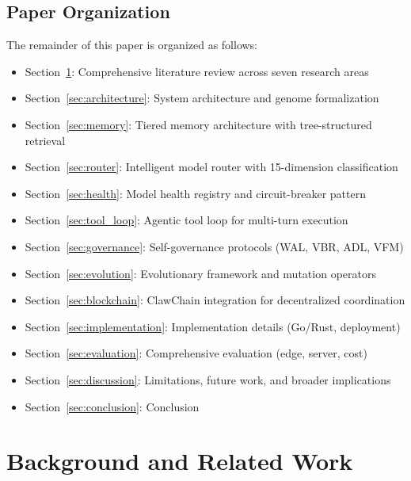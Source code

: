 \documentclass{article}
\begin{document}
\subsection{Paper Organization}

The remainder of this paper is organized as follows:

\begin{itemize}[leftmargin=*]
    \item Section~\ref{sec:related}: Comprehensive literature review across seven research areas
    \item Section~\ref{sec:architecture}: System architecture and genome formalization
    \item Section~\ref{sec:memory}: Tiered memory architecture with tree-structured retrieval
    \item Section~\ref{sec:router}: Intelligent model router with 15-dimension classification
    \item Section~\ref{sec:health}: Model health registry and circuit-breaker pattern
    \item Section~\ref{sec:tool_loop}: Agentic tool loop for multi-turn execution
    \item Section~\ref{sec:governance}: Self-governance protocols (WAL, VBR, ADL, VFM)
    \item Section~\ref{sec:evolution}: Evolutionary framework and mutation operators
    \item Section~\ref{sec:blockchain}: ClawChain integration for decentralized coordination
    \item Section~\ref{sec:implementation}: Implementation details (Go/Rust, deployment)
    \item Section~\ref{sec:evaluation}: Comprehensive evaluation (edge, server, cost)
    \item Section~\ref{sec:discussion}: Limitations, future work, and broader implications
    \item Section~\ref{sec:conclusion}: Conclusion
\end{itemize}


\section{Background and Related Work}
\label{sec:related}
\end{document}
